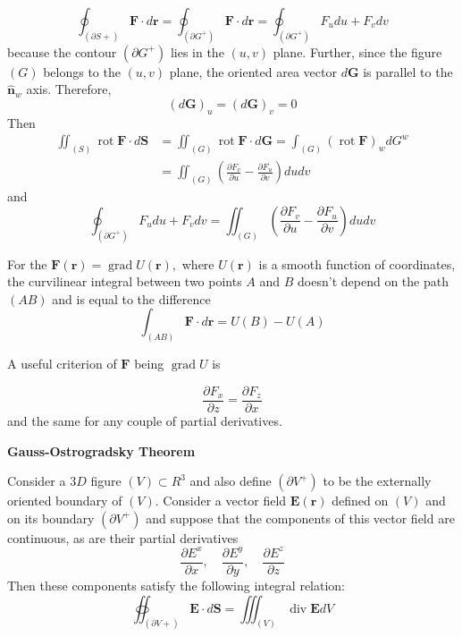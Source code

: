 $$
\oint_{(\partial S+)} \mathbf{F} \cdot d \mathbf{r}=\oint_{\left(\partial G^{+}\right)} \mathbf{F} \cdot d \mathbf{r}=\oint_{\left(\partial G^{+}\right)} F_{u} d u+F_{v} d v
$$
because the contour $\left(\partial G^{+}\right)$ lies in the $(u, v)$ plane. Further, since the figure $(G)$ belongs to the $(u, v)$ plane, the oriented area vector $d \mathbf{G}$ is parallel to the $\hat{\mathbf{n}}_{w}$ axis. Therefore, 
$$
(d \mathbf{G})_{u}=\left(d \mathbf{G}\right)_{v}=0
$$
Then
\begin{equation}
\begin{aligned}
\iint_{(S)} \operatorname{rot} \mathbf{F} \cdot d \mathbf{S} &=\iint_{(G)} \operatorname{rot} \mathbf{F} \cdot d \mathbf{G}=\int_{(G)}(\operatorname{rot} \mathbf{F})_{w} d G^{w} \\
&=\iint_{(G)}\left(\frac{\partial F_{v}}{\partial u}-\frac{\partial F_{u}}{\partial v}\right) d u d v
\end{aligned}
\end{equation}
and
\begin{equation}
\oint_{\left(\partial G^{+}\right)} F_{u} d u+F_{v} d v=\iint_{(G)}\left(\frac{\partial F_{v}}{\partial u}-\frac{\partial F_{u}}{\partial v}\right) d u d v
\end{equation}
\begin{thm}
 For the $\mathbf{F}(\mathbf{r})=\operatorname{grad} U(\mathbf{r}),$ where $U(\mathbf{r})$ is a smooth function of coordinates, the curvilinear integral between two points $A$ and $B$ doesn't depend on the path $(A B)$ and is equal to the difference
 \begin{equation}
\int_{(A B)} \mathbf{F} \cdot d \mathbf{r}=U(B)-U(A)
\end{equation}
\end{thm}
A useful criterion of $\mathbf{F}$ being $\operatorname{grad} U$ is
\begin{qt}
\begin{equation}
\frac{\partial F_{x}}{\partial z}=\frac{\partial F_{z}}{\partial x}
\end{equation}
and the same for any couple of partial derivatives.
\end{qt}
\begin{thm}
 \textbf{Gauss-Ostrogradsky Theorem}
 
 Consider a $3 D$ figure $(V) \subset R^{3}$ and also define $\left(\partial V^{+}\right)$ to be the externally oriented boundary of $(V) .$ Consider a vector field $\mathbf{E}(\mathbf{r})$ defined on $(V)$ and on its boundary $\left(\partial V^{+}\right)$ and suppose that the components of this vector field are continuous, as are their partial derivatives
 $$
\frac{\partial E^{x}}{\partial x}, \quad \frac{\partial E^{y}}{\partial y}, \quad \frac{\partial E^{z}}{\partial z}
$$
Then these components satisfy the following integral relation:
\begin{equation}
\oiint_{(\partial V+)} \mathbf{E} \cdot d \mathbf{S}=\iiint_{(V)} \operatorname{div} \mathbf{E} d V
\end{equation}
\end{thm}
